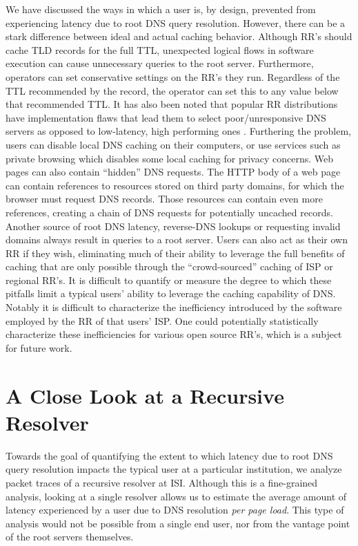 \documentclass[sigconf,nonacm,10pt]{acmart}
\begin{document}
We have discussed the ways in which a user is, by design, prevented from
experiencing latency due to root DNS query resolution. However, there
can be a stark difference between ideal and actual caching behavior.
Although RR's should cache TLD records for the full TTL, unexpected
logical flows in software execution can cause unnecessary queries to the
root server. Furthermore, operators can set conservative settings on the
RR's they run. Regardless of the TTL recommended by the record, the
operator can set this to any value below that recommended TTL. It has
also been noted that popular RR distributions have implementation flaws
that lead them to select poor/unresponsive DNS servers as opposed to
low-latency, high performing ones \cite{yu2012authority}. \break
Furthering the problem, users can disable local DNS caching on their
computers, or use services such as private browsing which disables some
local caching for privacy concerns. Web pages can also contain
``hidden'' DNS requests. The HTTP body of a web page can contain
references to resources stored on third party domains, for which the
browser must request DNS records. Those resources can contain even more
references, creating a chain of DNS requests for potentially uncached
records. Another source of root DNS latency, reverse-DNS lookups or
requesting invalid domains always result in queries to a root server.
Users can also act as their own RR if they wish, eliminating much of
their ability to leverage the full benefits of caching that are only
possible through the ``crowd-sourced'' caching of ISP or regional RR's.
\break \break
It is difficult to quantify or measure the degree to which these
pitfalls limit a typical users' ability to leverage the caching
capability of DNS. Notably it is difficult to characterize the
inefficiency introduced by the software employed by the RR of that
users' ISP. One could potentially statistically characterize these
inefficiencies for various open source RR's, which is a subject for
future work.

\section{A Close Look at a Recursive
Resolver}\label{a-close-look-at-a-recursive-resolver-1}

\label{sec:rr_close_look} Towards the goal of quantifying the extent to
which latency due to root DNS query resolution impacts the typical user
at a particular institution, we analyze packet traces of a recursive
resolver at ISI. Although this is a fine-grained analysis, looking at a
single resolver allows us to estimate the average amount of latency
experienced by a user due to DNS resolution \textit{per page load}. This
type of analysis would not be possible from a single end user, nor from
the vantage point of the root servers themselves.
\end{document}
